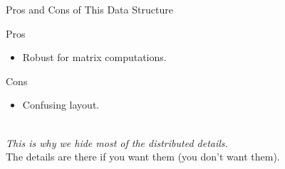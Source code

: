 %  












\begin{frame}
  \begin{block}{Pros and Cons of This Data Structure}\pause
  \begin{center}
    \begin{minipage}[t]{.45\textwidth}
      \begin{center}
      \begin{block}{Pros}
	\begin{itemize}
	\item Robust for matrix computations.
	\end{itemize}
      \end{block}
      \end{center}
    \end{minipage}\hspace{.5cm}
    \begin{minipage}[t]{.45\textwidth}
      \begin{center}
      \begin{block}{Cons}
	\begin{itemize}
	  \item Confusing layout.
	\end{itemize}
      \end{block}
      \end{center}
    \end{minipage}
    \\[.6cm]
    \emph{This is why we hide most of the distributed details.}
    \\[.4cm]
    The details are there if you want them (you don't want them).
  \end{center}
  \end{block}
\end{frame}


